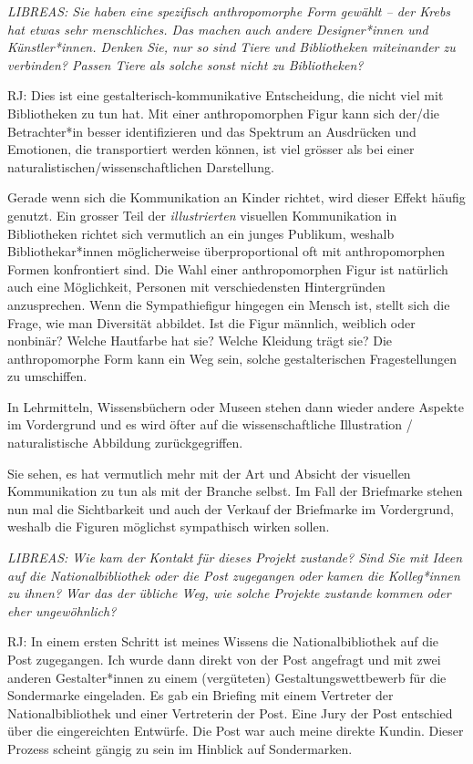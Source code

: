 \documentclass[a4paper,
fontsize=11pt,
oneside,
numbers=noperiodatend,
parskip=half-,
bibliography=totoc,
final
]{scrartcl}
\begin{document}
\emph{LIBREAS: Sie haben eine spezifisch anthropomorphe Form gewählt --
der Krebs hat etwas sehr menschliches. Das machen auch andere
Designer*innen und Künstler*innen. Denken Sie, nur so sind Tiere und
Bibliotheken miteinander zu verbinden? Passen Tiere als solche sonst
nicht zu Bibliotheken?}

RJ: Dies ist eine gestalterisch-kommunikative Entscheidung, die nicht
viel mit Bibliotheken zu tun hat. Mit einer anthropomorphen Figur kann
sich der/die Betrachter*in besser identifizieren und das Spektrum an
Ausdrücken und Emotionen, die transportiert werden können, ist viel
grösser als bei einer naturalistischen/wissenschaftlichen Darstellung.

Gerade wenn sich die Kommunikation an Kinder richtet, wird dieser Effekt
häufig genutzt. Ein grosser Teil der \emph{illustrierten} visuellen
Kommunikation in Bibliotheken richtet sich vermutlich an ein junges
Publikum, weshalb Bibliothekar*innen möglicherweise überproportional oft
mit anthropomorphen Formen konfrontiert sind. Die Wahl einer
anthropomorphen Figur ist natürlich auch eine Möglichkeit, Personen mit
verschiedensten Hintergründen anzusprechen. Wenn die Sympathiefigur
hingegen ein Mensch ist, stellt sich die Frage, wie man Diversität
abbildet. Ist die Figur männlich, weiblich oder nonbinär? Welche
Hautfarbe hat sie? Welche Kleidung trägt sie? Die anthropomorphe Form
kann ein Weg sein, solche gestalterischen Fragestellungen zu umschiffen.

In Lehrmitteln, Wissensbüchern oder Museen stehen dann wieder andere
Aspekte im Vordergrund und es wird öfter auf die wissenschaftliche
Illustration / naturalistische Abbildung zurückgegriffen.

Sie sehen, es hat vermutlich mehr mit der Art und Absicht der visuellen
Kommunikation zu tun als mit der Branche selbst. Im Fall der Briefmarke
stehen nun mal die Sichtbarkeit und auch der Verkauf der Briefmarke im
Vordergrund, weshalb die Figuren möglichst sympathisch wirken sollen.

\emph{LIBREAS: Wie kam der Kontakt für dieses Projekt zustande? Sind Sie
mit Ideen auf die Nationalbibliothek oder die Post zugegangen oder kamen
die Kolleg*innen zu ihnen? War das der übliche Weg, wie solche Projekte
zustande kommen oder eher ungewöhnlich?}

RJ: In einem ersten Schritt ist meines Wissens die Nationalbibliothek
auf die Post zugegangen. Ich wurde dann direkt von der Post angefragt
und mit zwei anderen Gestalter*innen zu einem (vergüteten)
Gestaltungswettbewerb für die Sondermarke eingeladen. Es gab ein
Briefing mit einem Vertreter der Nationalbibliothek und einer
Vertreterin der Post. Eine Jury der Post entschied über die
eingereichten Entwürfe. Die Post war auch meine direkte Kundin. Dieser
Prozess scheint gängig zu sein im Hinblick auf Sondermarken.
\end{document}
